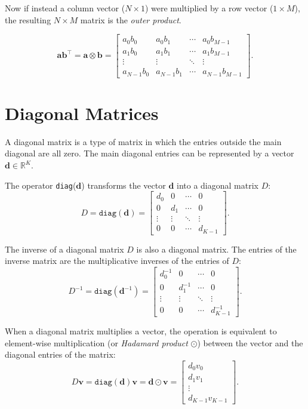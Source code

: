 \documentclass[twoside]{article}
\begin{document}
\begin{appendices}
Now if instead a column vector ($N \times 1$) were multiplied by a row vector ($1 \times M$), the resulting $N \times M$ matrix is the \textit{outer product}.
 
 \[
 \boldsymbol{a} \boldsymbol{b}^\top = \boldsymbol{a} \otimes \boldsymbol{b} =
\begin{bmatrix}
    {a}_0 {b}_0 & {a}_0 {b}_1 & \cdots & {a}_0 {b}_{M-1} \\
    {a}_1 {b}_0 & {a}_1 {b}_1 & \cdots & {a}_1 {b}_{M-1} \\
    \vdots & \vdots & \ddots & \vdots \\
    {a}_{N-1} {b}_0 & {a}_{N-1} {b}_1 & \cdots & {a}_{N-1} {b}_{M-1}
\end{bmatrix}.
\]

\section{Diagonal Matrices}
\label{appendix:diagonals}

A diagonal matrix is a type of matrix in which the entries outside the main diagonal are all zero. The main diagonal entries can be represented by a vector $\boldsymbol{d} \in \mathbb{R}^K$. 

The operator \texttt{diag}($\boldsymbol{d}$) transforms the vector $\boldsymbol{d}$ into a diagonal matrix $D$:
\[
D = \texttt{diag}(\boldsymbol{d}) = 
\begin{bmatrix}
    d_0 & 0 & \cdots & 0 \\
    0 & d_1 & \cdots & 0 \\
    \vdots & \vdots & \ddots & \vdots \\
    0 & 0 & \cdots & d_{K-1}
\end{bmatrix}.
\]

The inverse of a diagonal matrix $D$ is also a diagonal matrix. The entries of the inverse matrix are the multiplicative inverses of the entries of $D$:
\[
D^{-1} = \texttt{diag}(\boldsymbol{d}^{-1}) = 
\begin{bmatrix}
    d_0^{-1} & 0 & \cdots & 0 \\
    0 & d_1^{-1} & \cdots & 0 \\
    \vdots & \vdots & \ddots & \vdots \\
    0 & 0 & \cdots & d_{K-1}^{-1}
\end{bmatrix}.
\]

When a diagonal matrix multiplies a vector, the operation is equivalent to element-wise multiplication (or \textit{Hadamard product} $\odot$) between the vector and the diagonal entries of the matrix:
\[
D\boldsymbol{v} = \texttt{diag}(\boldsymbol{d}) \boldsymbol{v} = \boldsymbol{d} \odot \boldsymbol{v} =
\begin{bmatrix}
    d_0 v_0 \\
    d_1 v_1 \\
    \vdots \\
    d_{K-1} v_{K-1}
\end{bmatrix}.
\]


\end{appendices}
\end{document}
